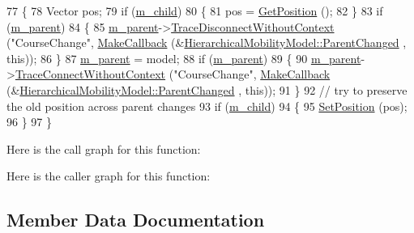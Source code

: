 \begin{DoxyCode}
77 \{
78   Vector pos;
79   \textcolor{keywordflow}{if} (\hyperlink{classns3_1_1HierarchicalMobilityModel_a07ebcdb83ae4934089832879b1b2f6ca}{m\_child})
80     \{
81       pos = \hyperlink{classns3_1_1MobilityModel_aba838f06ec5bbb2d193d94b8c0e4abb4}{GetPosition} ();
82     \}
83   \textcolor{keywordflow}{if} (\hyperlink{classns3_1_1HierarchicalMobilityModel_a5fba1ec797033befe2d231649919d3e0}{m\_parent})
84     \{
85       \hyperlink{classns3_1_1HierarchicalMobilityModel_a5fba1ec797033befe2d231649919d3e0}{m\_parent}->\hyperlink{classns3_1_1ObjectBase_a460d74131ef97d9d7ba79c6d70b2f304}{TraceDisconnectWithoutContext} (\textcolor{stringliteral}{"CourseChange"}, 
      \hyperlink{group__makecallbackmemptr_ga9376283685aa99d204048d6a4b7610a4}{MakeCallback} (&\hyperlink{classns3_1_1HierarchicalMobilityModel_ad702b836af69d11308ef4735e8f77f63}{HierarchicalMobilityModel::ParentChanged}
      , \textcolor{keyword}{this}));
86     \}
87   \hyperlink{classns3_1_1HierarchicalMobilityModel_a5fba1ec797033befe2d231649919d3e0}{m\_parent} = model;
88   \textcolor{keywordflow}{if} (\hyperlink{classns3_1_1HierarchicalMobilityModel_a5fba1ec797033befe2d231649919d3e0}{m\_parent})
89     \{
90       \hyperlink{classns3_1_1HierarchicalMobilityModel_a5fba1ec797033befe2d231649919d3e0}{m\_parent}->\hyperlink{classns3_1_1ObjectBase_a1be45f6fd561e75dcac9dfa81b2b81e4}{TraceConnectWithoutContext} (\textcolor{stringliteral}{"CourseChange"}, 
      \hyperlink{group__makecallbackmemptr_ga9376283685aa99d204048d6a4b7610a4}{MakeCallback} (&\hyperlink{classns3_1_1HierarchicalMobilityModel_ad702b836af69d11308ef4735e8f77f63}{HierarchicalMobilityModel::ParentChanged}
      , \textcolor{keyword}{this}));
91     \}
92   \textcolor{comment}{// try to preserve the old position across parent changes}
93   \textcolor{keywordflow}{if} (\hyperlink{classns3_1_1HierarchicalMobilityModel_a07ebcdb83ae4934089832879b1b2f6ca}{m\_child})
94     \{
95       \hyperlink{classns3_1_1MobilityModel_ac584b3d5a309709d2f13ed6ada1e7640}{SetPosition} (pos);
96     \}
97 \}
\end{DoxyCode}


Here is the call graph for this function\+:




Here is the caller graph for this function\+:




\subsection{Member Data Documentation}
